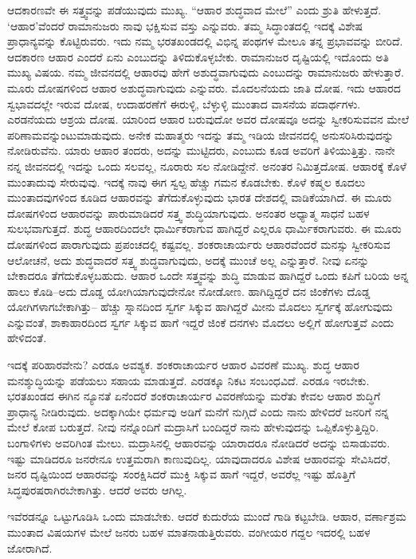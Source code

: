 ಆದಕಾರಣವೇ ಈ ಸತ್ತ್ವವನ್ನು ಪಡೆಯುವುದು ಮುಖ್ಯ. “ಆಹಾರ ಶುದ್ಧವಾದ ಮೇಲೆ” ಎಂದು ಶ್ರುತಿ ಹೇಳುತ್ತದೆ. ‘ಆಹಾರ’ವೆಂದರೆ ರಾಮಾನುಜರು ನಾವು ಭಕ್ಷಿಸುವ ವಸ್ತು ಎನ್ನುವರು. ತಮ್ಮ ಸಿದ್ಧಾಂತದಲ್ಲಿ ಇದಕ್ಕೆ ವಿಶೇಷ ಪ್ರಾಧಾನ್ಯವನ್ನು ಕೊಟ್ಟಿರುವರು. ಇದು ನಮ್ಮ ಭರತಖಂಡದಲ್ಲಿ ವಿಭಿನ್ನ ಪಂಥಗಳ ಮೇಲೂ ತನ್ನ ಪ್ರಭಾವವನ್ನು ಬೀರಿದೆ. ಆದಕಾರಣ ಆಹಾರ ಎಂದರೆ ಏನು ಎಂಬುದನ್ನು ತಿಳಿದುಕೊಳ್ಳಬೇಕು. ರಾಮಾನುಜರ ದೃಷ್ಟಿಯಲ್ಲಿ ಇದೊಂದು ಅತಿ ಮುಖ್ಯ ವಿಷಯ. ನಮ್ಮ ಜೀವನದಲ್ಲಿ ಆಹಾರವು ಹೇಗೆ ಅಶುದ್ಧವಾಗುವುದು ಎಂಬುದನ್ನು ರಾಮಾನುಜರು ಹೇಳುತ್ತಾರೆ. ಮೂರು ದೋಷಗಳಿಂದ ಆಹಾರ ಅಶುದ್ಧವಾಗುವುದು ಎನ್ನುವರು. ಮೊದಲನೆಯದು ಜಾತಿ ದೋಷ. ಇದು ಆಹಾರದ ಸ್ವಭಾವದಲ್ಲೇ ಇರುವ ದೋಷ, ಉದಾಹರಣೆಗೆ ಈರುಳ್ಳಿ, ಬೆಳ್ಳುಳ್ಳಿ ಮುಂತಾದ ವಾಸನೆಯ ಪದಾರ್ಥಗಳು. ಎರಡನೆಯದು ಆಶ್ರಯ ದೋಷ. ಯಾರಿಂದ ಆಹಾರ ಬರುವುದೋ ಅವರ ದೋಷವೂ ಅದನ್ನು ಸ್ವೀಕರಿಸುವವನ ಮೇಲೆ ಪರಿಣಾಮವನ್ನುಂಟುಮಾಡುವುದು. ಅನೇಕ ಮಹಾತ್ಮರು ಇದನ್ನು ತಮ್ಮ ಇಡಿಯ ಜೀವನದಲ್ಲಿ ಅನುಸರಿಸಿರುವುದನ್ನು ನೋಡಿರುವೆನು. ಯಾರು ಆಹಾರ ತಂದರು, ಅದನ್ನು ಮುಟ್ಟಿದರು, ಎಂಬುದು ಕೂಡ ಅವರಿಗೆ ತಿಳಿಯುತ್ತಿತ್ತು. ನಾನೇ ನನ್ನ ಜೀವನದಲ್ಲಿ ಇದನ್ನು ಒಂದು ಸಲವಲ್ಲ, ನೂರಾರು ಸಲ ನೋಡಿದ್ದೇನೆ. ಅನಂತರ ನಿಮಿತ್ತದೋಷ. ಆಹಾರಕ್ಕೆ ಕೊಳೆ ಮುಂತಾದುವು ಸೇರುವುವು. ಇದಕ್ಕೆ ನಾವು ಈಗ ಸ್ವಲ್ಪ ಹೆಚ್ಚು ಗಮನ ಕೊಡಬೇಕು. ಕೊಳೆ ಕಷ್ಮಲ ಕೂದಲು ಮುಂತಾದವುಗಳಿಂದ ಕೂಡಿದ ಆಹಾರವನ್ನು ತೆಗೆದುಕೊಳ್ಳುವುದು ಭಾರತ ದೇಶದಲ್ಲಿ ವಾಡಿಕೆಯಾಗಿದೆ. ಈ ಮೂರು ದೋಷಗಳಿಂದ ಆಹಾರವನ್ನು ಪಾರುಮಾಡಿದರೆ ಸತ್ತ್ವ ಶುದ್ಧಿಯಾಗುವುದು. ಅನಂತರ ಅಧ್ಯಾತ್ಮ ಸಾಧನೆ ಬಹಳ ಸುಲಭವಾಗುತ್ತದೆ. ಶುದ್ಧ ಆಹಾರದಿಂದಲೇ ಧಾರ್ಮಿಕರಾಗುವ ಹಾಗಿದ್ದರೆ ಎಲ್ಲರೂ ಧಾರ್ಮಿಕರಾಗುವರು. ಈ ಮೂರು ದೋಷಗಳಿಂದ ಪಾರಾಗುವುದು ಪ್ರಪಂಚದಲ್ಲಿ ಕಷ್ಟವಲ್ಲ. ಶಂಕರಾಚಾರ್ಯರು ಆಹಾರವೆಂದರೆ ಮನಸ್ಸು ಸ್ವೀಕರಿಸುವ ಆಲೋಚನೆ, ಅದು ಶುದ್ಧವಾದರೆ ಸತ್ತ್ವ ಶುದ್ಧವಾಗುವುದು, ಅದಕ್ಕೆ ಮುಂಚೆ ಅಲ್ಲ ಎನ್ನುತ್ತಾರೆ. ನೀವು ಏನನ್ನು ಬೇಕಾದರೂ ತೆಗೆದುಕೊಳ್ಳಬಹುದು. ಆಹಾರ ಒಂದೇ ಸತ್ತ್ವವನ್ನು ಶುದ್ಧಿ ಮಾಡುವ ಹಾಗಿದ್ದರೆ ಒಂದು ಕಪಿಗೆ ಬರಿಯ ಅನ್ನ ಹಾಲು ಕೊಡಿ–ಅದು ದೊಡ್ಡ ಯೋಗಿಯಾಗುವುದೇನೋ ನೋಡೋಣ. ಹಾಗಿದ್ದಿದ್ದರೆ ದನ ಜಿಂಕೆಗಳು ದೊಡ್ಡ ಯೋಗಿಗಳಾಗಬೇಕಾಗಿತ್ತು– ಹೆಚ್ಚು ಸ್ನಾನದಿಂದ ಸ್ವರ್ಗ ಸಿಕ್ಕುವ ಹಾಗಿದ್ದರೆ ಮೀನು ಮೊದಲು ಸ್ವರ್ಗಕ್ಕೆ ಹೋಗುವುದು ಎನ್ನುವಂತೆ, ಶಾಕಾಹಾರದಿಂದ ಸ್ವರ್ಗ ಸಿಕ್ಕುವ ಹಾಗೆ ಇದ್ದರೆ ಜಿಂಕೆ ದನಗಳು ಮೊದಲು ಅಲ್ಲಿಗೆ ಹೋಗುತ್ತವೆ ಎಂದು ಹೇಳಿದಂತೆ.

ಇದಕ್ಕೆ ಪರಿಹಾರವೇನು? ಎರಡೂ ಅವಶ್ಯಕ. ಶಂಕರಾಚಾರ್ಯರ ಆಹಾರ ವಿವರಣೆ ಮುಖ್ಯ. ಶುದ್ಧ ಆಹಾರ ಮನಶ್ಶುದ್ಧಿಯನ್ನು ಪಡೆಯಲು ಸಹಾಯ ಮಾಡುತ್ತದೆ. ಎರಡಕ್ಕೂ ನಿಕಟ ಸಂಬಂಧವಿದೆ. ಎರಡೂ ಇರಬೇಕು. ಭರತಖಂಡದ ಈಗಿನ ನ್ಯೂನತೆ ಏನೆಂದರೆ ಶಂಕರಾಚಾರ್ಯರ ವಿವರಣೆಯನ್ನು ಮರೆತು ಕೇವಲ ಆಹಾರ ಶುದ್ಧಿಗೆ ಪ್ರಾಧಾನ್ಯ ನೀಡಿರುವುದು. ಅದಕ್ಕಾಗಿಯೇ ಧರ್ಮವು ಅಡಿಗೆ ಮನೆಗೆ ನುಗ್ಗಿದೆ ಎಂದು ನಾನು ಹೇಳಿದರೆ ಜನರಿಗೆ ನನ್ನ ಮೇಲೆ ಕೋಪ ಬರುತ್ತದೆ. ನೀವು ನನ್ನೊಂದಿಗೆ ಮದ್ರಾಸಿಗೆ ಬಂದಿದ್ದರೆ ನಾನು ಹೇಳುವುದನ್ನು ಒಪ್ಪಿಕೊಳ್ಳುತ್ತಿದ್ದಿರಿ. ಬಂಗಾಳಿಗಳು ಅವರಿಗಿಂತ ಮೇಲು. ಮದ್ರಾಸಿನಲ್ಲಿ ಆಹಾರವನ್ನು ಯಾರಾದರೂ ನೋಡಿದರೆ ಅದನ್ನು ಬಿಸಾಡುವರು. ಇಷ್ಟು ಮಾಡಿದರೂ ಜನರೇನೂ ಉತ್ತಮರಾಗಿ ಕಾಣುವುದಿಲ್ಲ. ಯಾವುದಾದರೂ ವಿಶೇಷ ಆಹಾರವನ್ನು ಸೇವಿಸಿದರೆ, ಜನರ ದೃಷ್ಟಿಯಿಂದ ಆಹಾರವನ್ನು ಸಂರಕ್ಷಿಸಿದರೆ ಮುಕ್ತಿ ಸಿಕ್ಕುವ ಹಾಗೆ ಇದ್ದರೆ, ಅವರೆಲ್ಲ ಇಷ್ಟು ಹೊತ್ತಿಗೆ ಸಿದ್ಧಪುರಷರಾಗಿರಬೇಕಾಗಿತ್ತು. ಆದರೆ ಅವರು ಆಗಿಲ್ಲ.

ಇವೆರಡನ್ನೂ ಒಟ್ಟುಗೂಡಿಸಿ ಒಂದು ಮಾಡಬೇಕು. ಆದರೆ ಕುದುರೆಯ ಮುಂದೆ ಗಾಡಿ ಕಟ್ಟಬೇಡಿ. ಆಹಾರ, ವರ್ಣಾಶ್ರಮ ಮುಂತಾದ ವಿಷಯಗಳ ಮೇಲೆ ಜನರು ಬಹಳ ಮಾತನಾಡುತ್ತಿರುವರು. ವಂಗೀಯರ ಗದ್ದಲ ಇದರಲ್ಲಿ ಬಹಳ ಜೋರಾಗಿದೆ.

